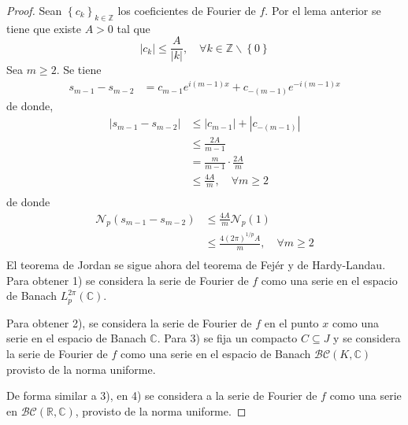 \documentclass[12pt]{report}
\newcounter{it}
\theoremstyle{largebreak}
\renewcommand{\leq}{\ensuremath{\leqslant}}
\renewcommand{\geq}{\ensuremath{\geqslant}}
\newcommand\abs[1]{\ensuremath{\left|#1\right|}}
\newcommand{\N}[2]{\ensuremath{\mathcal{N}_{#1}\left(#2\right)}}
\begin{document}
    \begin{proof}
        Sean $\left\{c_k \right\}_{ k\in\mathbb{Z}}$ los coeficientes de Fourier de $f$. Por el lema anterior se tiene que existe $A>0$ tal que
        \begin{equation*}
            \abs{c_k}\leq\frac{A}{\abs{k}},\quad\forall k\in\mathbb{Z}\backslash\left\{0\right\}
        \end{equation*}
        Sea $m\geq2$. Se tiene 
        \begin{equation*}
            \begin{split}
                s_{ m-1}-s_{ m-2}&=c_{ m-1}e^{ i(m-1)x}+c_{ -(m-1)}e^{ -i(m-1)x}
            \end{split}
        \end{equation*}
        de donde,
        \begin{equation*}
            \begin{split}
                \abs{s_{ m-1}-s_{ m-2}}&\leq\abs{c_{ m-1}}+\abs{c_{ -(m-1)}}\\
                &\leq\frac{2A}{m-1}\\
                &=\frac{m}{m-1}\cdot\frac{2A}{m}\\
                &\leq\frac{4A}{m},\quad\forall m\geq2\\
            \end{split}
        \end{equation*}
        de donde
        \begin{equation*}
            \begin{split}
                \N{p}{s_{ m-1}-s_{ m-2}}&\leq\frac{4A}{m}\N{p}{1}\\
                &\leq\frac{4(2\pi)^{1/p}A}{m},\quad\forall m\geq 2\\
            \end{split}
        \end{equation*}
        El teorema de Jordan se sigue ahora del teorema de Fejér y de Hardy-Landau. Para obtener 1) se considera la serie de Fourier de $f$ como una serie en el espacio de Banach $L_p^{2\pi}(\mathbb{C})$.

        Para obtener 2), se considera la serie de Fourier de $f$ en el punto $x$ como una serie en el espacio de Banach $\mathbb{C}$. Para 3) se fija un compacto $C\subseteq J$ y se considera la serie de Fourier de $f$ como una serie en el espacio de Banach $\mathcal{BC}(K,\mathbb{C})$ provisto de la norma uniforme.

        De forma similar a 3), en 4) se considera a la serie de Fourier de $f$ como una serie en $\mathcal{ BC}(\mathbb{R},\mathbb{C})$, provisto de la norma uniforme.
    \end{proof}
\end{document}
